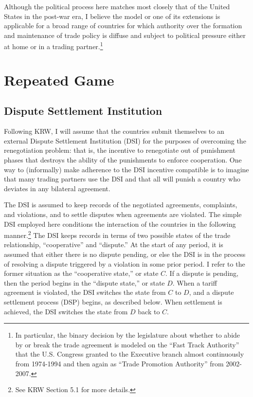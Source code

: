 \documentclass[authoryear, review]{elsarticle}
\begin{document}
Although the political process here matches most closely that of the United States in the post-war era, I believe the model or one of its extensions is applicable for a broad range of countries for which authority over the formation and maintenance of trade policy is diffuse and subject to political pressure either at home or in a trading partner.\footnote{In particular, the binary decision by the legislature about whether to abide by or break the trade agreement is modeled on the ``Fast Track Authority'' that the U.S. Congress granted to the Executive branch almost continuously from 1974-1994 and then again as ``Trade Promotion Authority'' from 2002-2007.} 

\section{Repeated Game}
\label{sec:repeated}
\subsection{Dispute Settlement Institution}
Following KRW, I will assume that the countries submit themselves to an external Dispute Settlement Institution (DSI) for the purposes of overcoming the renegotiation problem: that is, the incentive to renegotiate out of punishment phases that destroys the ability of the punishments to enforce cooperation. One way to (informally) make adherence to the DSI incentive compatible is to imagine that many trading partners use the DSI and that all will punish a country who deviates in any bilateral agreement.

The DSI is assumed to keep records of the negotiated agreements, complaints, and violations, and to settle disputes when agreements are violated. 
The simple DSI employed here conditions the interaction of the countries in the following manner.\footnote{See KRW Section 5.1 for more details.} The DSI keeps records in terms of two possible states of the trade relationship, ``cooperative'' and ``dispute.'' At the start of any period, it is assumed that either there is no dispute pending, or else the DSI is in the process of resolving a dispute triggered by a violation in some prior period. I refer to the former situation as the ``cooperative state,'' or state $C$. If a dispute is pending, then the period begins in the ``dispute state,'' or state $D$. When a tariff agreement is violated, the DSI switches the state from $C$ to $D$, and a dispute settlement process (DSP) begins, as described below. When settlement is achieved, the DSI switches the state from $D$ back to $C$. 
\end{document}
